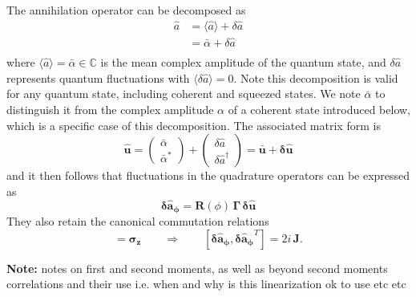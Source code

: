 The annihilation operator can be decomposed as
\begin{equation}
\begin{split}
    \hat{a} & = \langle \hat{a} \rangle + \delta\hat{a}\\
    & = \bar{\alpha} + \delta\hat{a} \\
\end{split}
\label{II.8}
\end{equation}
where \(\langle \hat{a} \rangle = \bar{\alpha} \in \mathbb{C}\) is the mean complex amplitude of the quantum state, and \(\delta\hat{a}\) represents quantum fluctuations with \(\langle \delta\hat{a}\rangle = 0\). Note this decomposition is valid for any quantum state, including coherent and squeezed states. We note $\bar{\alpha}$ to distinguish it from the complex amplitude $\alpha$ of a coherent state introduced below, which is a specific case of this decomposition. The associated matrix form is 
\begin{equation}
\mathbf{\hat{u}} =  \begin{pmatrix} \bar{\alpha}  \\ \bar{\alpha}^*  \end{pmatrix} + \begin{pmatrix} \delta\hat{a} \\ \delta\hat{a}^\dagger \end{pmatrix} =  \mathbf{\bar{u}} + \mathbf{\delta \hat{u}}
\end{equation}
and it then follows that fluctuations in the quadrature operators can be expressed as
\begin{equation}
  \mathbf{\delta \hat{a}_\phi} = \mathbf{R}(\phi) \, \mathbf\Gamma  \, \mathbf{\delta \hat{u}}
\end{equation}
They also retain the canonical commutation relations
\begin{equation}
[\mathbf{\delta \hat{u}}, \mathbf{\delta \hat{u}}^{\dagger}] = \mathbf{\sigma_z} \qquad \Rightarrow \qquad
[\mathbf{\delta \hat{a}_\phi}, \mathbf{\delta \hat{a}_\phi}^{T}] = 2i\,\mathbf{J}.
\label{II.11}
\end{equation}

\noindent \textbf{Note:} \color{red} notes on first and second moments, as well as beyond second moments correlations and their use i.e. when and why is this linearization ok to use etc etc \color{black}

